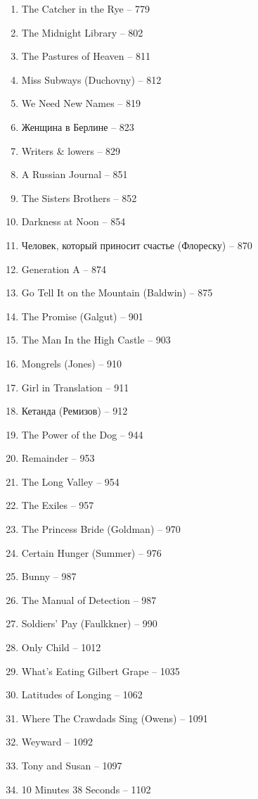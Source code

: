 \documentclass[a4paper, 11pt]{proc} %
\begin{document}
\begin{enumerate}
    \item The Catcher in the Rye -- 779
    \item The Midnight Library -- 802
    \item The Pastures of Heaven -- 811
    \item Miss Subways (Duchovny) -- 812
    \item We Need New Names -- 819
    \item Женщина в Берлине -- 823
    \item Writers \& lowers -- 829
    \item A Russian Journal -- 851
    \item The Sisters Brothers -- 852
    \item Darkness at Noon -- 854
    \item Человек, который приносит счастье (Флореску) -- 870
    \item Generation A -- 874
    \item Go Tell It on the Mountain (Baldwin) -- 875
    \item The Promise (Galgut) -- 901
    \item The Man In the High Castle -- 903
    \item Mongrels (Jones) -- 910
    \item Girl in Translation -- 911
    \item Кетанда (Ремизов) -- 912
    \item The Power of the Dog -- 944
    \item Remainder -- 953
    \item The Long Valley -- 954
    \item The Exiles -- 957
    \item The Princess Bride (Goldman) -- 970
    \item Certain Hunger (Summer) -- 976
    \item Bunny -- 987
    \item The Manual of Detection -- 987
    \item Soldiers' Pay (Faulkkner) -- 990
    \item Only Child -- 1012
    \item What's Eating Gilbert Grape -- 1035
    \item Latitudes of Longing -- 1062
    \item Where The Crawdads Sing (Owens) -- 1091
    \item Weyward -- 1092
    \item Tony and Susan -- 1097
    \item 10 Minutes 38 Seconds -- 1102

\end{enumerate}
\end{document}
